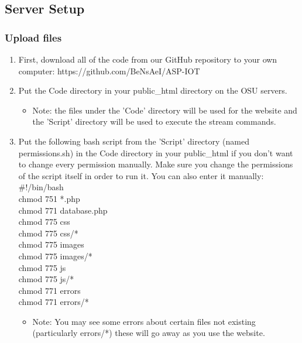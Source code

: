 \documentclass[onecolumn, draftclsnofoot,10pt, compsoc]{IEEEtran}
\begin{document}
\subsection{Server Setup}
\subsubsection{Upload files}
\begin{enumerate}
    \item First, download all of the code from our GitHub repository to your own computer: https://github.com/BeNsAeI/ASP-IOT
    
    \item Put the Code directory in your public\_html directory on the OSU servers.
    \begin{itemize}
        \item Note: the files under the 'Code' directory will be used for the website and the 'Script' directory will be used to execute the stream commands.
    \end{itemize}
    \item Put the following bash script from the 'Script' directory (named permissions.sh) in the Code directory in your public\_html if you don't want to change every permission manually. Make sure you change the permissions of the script itself in order to run it. You can also enter it manually:\\
    \hspace*{1cm} \#!/bin/bash \\ 
    \hspace*{1cm} chmod 751 *.php \\
    \hspace*{1cm} chmod 771 database.php \\
    \hspace*{1cm} chmod 775 css \\
    \hspace*{1cm} chmod 775 css/* \\
    \hspace*{1cm} chmod 775 images \\
    \hspace*{1cm} chmod 775 images/* \\
    \hspace*{1cm} chmod 775 js \\
    \hspace*{1cm} chmod 775 js/* \\
    \hspace*{1cm} chmod 771 errors \\
    \hspace*{1cm} chmod 771 errors/* 
    \begin{itemize}
        \item Note: You may see some errors about certain files not existing (particularly errors/*) these will go away as you use the website.
    \end{itemize}
\end{enumerate}
\end{document}
